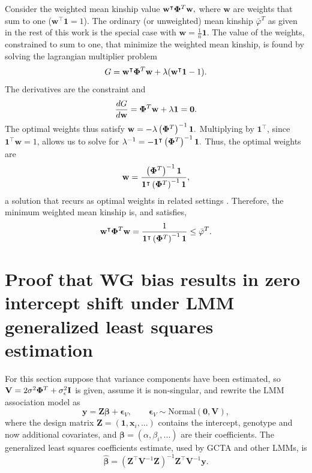 \documentclass[11pt]{article}
\newcommand{\kinMat}[1][T]{%
  \ensuremath{%
    \mathbf{\Phi}^{#1}
  }%
  \xspace%
}%
\begin{document}
\begin{appendices}
  Consider the weighted mean kinship value
  $
  \mathbf{w}^\intercal \kinMat \mathbf{w},
  $
  where $\mathbf{w}$ are weights that sum to one ($\mathbf{w}^\intercal \mathbf{1} = 1$).
  The ordinary (or unweighted) mean kinship $\bar{\varphi}^T$ as given in the rest of this work is the special case with $\mathbf{w} = \frac{1}{n} \mathbf{1}$.
  The value of the weights, constrained to sum to one, that minimize the weighted mean kinship, is found by solving the lagrangian multiplier problem
  $$
  G = \mathbf{w}^\intercal \kinMat \mathbf{w} + \lambda (\mathbf{w}^\intercal \mathbf{1} - 1).
  $$
  The derivatives are the constraint and
  $$
  \frac{dG}{d \mathbf{w}}
  =
  \kinMat \mathbf{w} + \lambda \mathbf{1} = \mathbf{0}.
  $$
  The optimal weights thus satisfy
  $
  \mathbf{w} = -\lambda \left( \kinMat \right)^{-1} \mathbf{1}.
  $
  Multiplying by $\mathbf{1}^\intercal$, since $\mathbf{1}^\intercal \mathbf{w} = 1$, allows us to solve for 
  $
  \lambda^{-1} = - \mathbf{1}^\intercal \left( \kinMat \right)^{-1} \mathbf{1}.
  $
  Thus, the optimal weights are
  $$
  \mathbf{w}
  = 
  \frac{ \left( \kinMat \right)^{-1} \mathbf{1} }{ \mathbf{1}^\intercal \left( \kinMat \right)^{-1} \mathbf{1} }
  ,
  $$
  a solution that recurs as optimal weights in related settings \citep{altschul_weights_1989, astle_population_2009}.
  Therefore, the minimum weighted mean kinship is, and satisfies,
  $$
  \mathbf{w}^\intercal \kinMat \mathbf{w}
  =
  \frac{ 1 }{ \mathbf{1}^\intercal \left( \kinMat \right)^{-1} \mathbf{1} }
  \le
  \bar{\varphi}^T
  .
  $$
    
  \section{Proof that WG bias results in zero intercept shift under LMM generalized least squares estimation}

  \label{sec:wg_gls}

  For this section suppose that variance components have been estimated, so $\mathbf{V} = 2 \sigma^2 \kinMat + \sigma^2_\epsilon \mathbf{I}$ is given, assume it is non-singular, and rewrite the LMM association model as
  $$
  \mathbf{y}
  =
  \mathbf{Z} \boldsymbol{\beta} + \boldsymbol{\epsilon}_V,
  \quad\quad
  \boldsymbol{\epsilon}_V \sim \text{Normal} \left( \mathbf{0}, \mathbf{V} \right),
  $$
  where the design matrix $\mathbf{Z} = (\mathbf{1}, \mathbf{x}_i, ...)$ contains the intercept, genotype and now additional covariates, and $\boldsymbol{\beta} = (\alpha, \beta_i, ...)$ are their coefficients.
  The generalized least squares coefficients estimate, used by GCTA and other LMMs, is
  $$
  \boldsymbol{\hat{\beta}} = \left( \mathbf{Z}^\intercal \mathbf{V}^{-1} \mathbf{Z} \right)^{-1} \mathbf{Z}^\intercal \mathbf{V}^{-1} \mathbf{y}.
  $$


\end{appendices}
\end{document}
